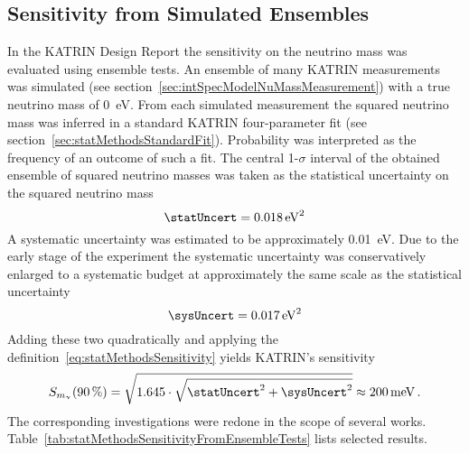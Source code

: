 \subsection{Sensitivity from Simulated Ensembles}
\label{sec:statMethodsSensitivtyFromEnsemble}
In the KATRIN Design Report the sensitivity on the neutrino mass was evaluated using ensemble tests. An ensemble of many KATRIN measurements was simulated (see section~\ref{sec:intSpecModelNuMassMeasurement}) with a true neutrino mass of \SI{0}{eV}. From each simulated measurement the squared neutrino mass was inferred in a standard KATRIN four-parameter fit (see section~\ref{sec:statMethodsStandardFit}). Probability was interpreted as the frequency of an outcome of such a fit. The central 1-$\sigma$ interval of the obtained ensemble of squared neutrino masses was taken as the statistical uncertainty on the squared neutrino mass~\cite{Angrik:2005ep}
\begin{equation}
	\statUncert = \SI{0.018}{eV^2}
\end{equation}
A systematic uncertainty was estimated to be approximately \SI{0.01}{eV}. Due to the early stage of the experiment the systematic uncertainty was conservatively enlarged to a systematic budget at approximately the same scale as the statistical uncertainty~\cite{Angrik:2005ep}
\begin{equation}
	\sysUncert = \SI{0.017}{eV^2}
\end{equation}
Adding these two quadratically and applying the definition~\eqref{eq:statMethodsSensitivity} yields KATRIN's sensitivity~\cite{Angrik:2005ep}
\begin{equation}
	\label{eq:statMethodsSensitivityDesignReport}
	S_{\nuMass}(\SI{90}{\percent}) = 
	\sqrt{1.645\cdot
		\sqrt{
		\statUncert^2+\sysUncert^2
	}} \approx \SI{200}{meV}
	\fullstop
\end{equation}
The corresponding investigations were redone in the scope of several works. Table~\ref{tab:statMethodsSensitivityFromEnsembleTests} lists selected results.
